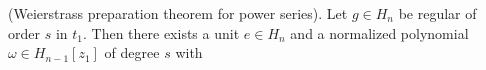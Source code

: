 (Weierstrass preparation theorem for power series). Let $g \in H_n$ be regular of order $s$ in $t_1$. Then there exists a unit $e \in H_n$ and a normalized polynomial $\omega \in H_{n-1}[z_1]$ of degree $s$ with
